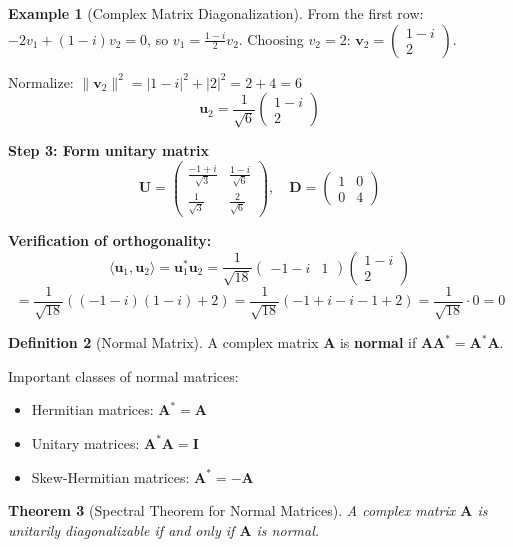 \documentclass[12pt]{article}
\numberwithin{equation}{section}
\newcommand{\vect}[1]{\boldsymbol{#1}}   %
\newcommand{\mat}[1]{\mathbf{#1}}        %
\theoremstyle{plain}
\newtheorem{theorem}{Theorem}[section]
\theoremstyle{definition}
\newtheorem{definition}[theorem]{Definition}
\newtheorem{example}[theorem]{Example}
\theoremstyle{remark}
\begin{document}
\begin{example}[Complex Matrix Diagonalization]
From the first row: $-2v_1 + (1-i)v_2 = 0$, so $v_1 = \frac{1-i}{2}v_2$.
Choosing $v_2 = 2$: $\vect{v}_2 = \begin{pmatrix} 1-i \\ 2 \end{pmatrix}$.

Normalize: $\|\vect{v}_2\|^2 = |1-i|^2 + |2|^2 = 2 + 4 = 6$
$$\vect{u}_2 = \frac{1}{\sqrt{6}}\begin{pmatrix} 1-i \\ 2 \end{pmatrix}$$

\textbf{Step 3: Form unitary matrix}
$$\mat{U} = \begin{pmatrix} \frac{-1+i}{\sqrt{3}} & \frac{1-i}{\sqrt{6}} \\ \frac{1}{\sqrt{3}} & \frac{2}{\sqrt{6}} \end{pmatrix}, \quad \mat{D} = \begin{pmatrix} 1 & 0 \\ 0 & 4 \end{pmatrix}$$

\textbf{Verification of orthogonality:}
$$\langle \vect{u}_1, \vect{u}_2 \rangle = \vect{u}_1^*\vect{u}_2 = \frac{1}{\sqrt{18}}\begin{pmatrix} -1-i & 1 \end{pmatrix}\begin{pmatrix} 1-i \\ 2 \end{pmatrix}$$
$$= \frac{1}{\sqrt{18}}((-1-i)(1-i) + 2) = \frac{1}{\sqrt{18}}(-1+i-i-1+2) = \frac{1}{\sqrt{18}} \cdot 0 = 0$$ \checkmark
\end{example}

\begin{definition}[Normal Matrix]
A complex matrix $\mat{A}$ is \textbf{normal} if $\mat{A}\mat{A}^* = \mat{A}^*\mat{A}$.

Important classes of normal matrices:
\begin{itemize}
\item Hermitian matrices: $\mat{A}^* = \mat{A}$
\item Unitary matrices: $\mat{A}^*\mat{A} = \mat{I}$
\item Skew-Hermitian matrices: $\mat{A}^* = -\mat{A}$
\end{itemize}
\end{definition}

\begin{theorem}[Spectral Theorem for Normal Matrices]
A complex matrix $\mat{A}$ is unitarily diagonalizable if and only if $\mat{A}$ is normal.
\end{theorem}
\end{document}
